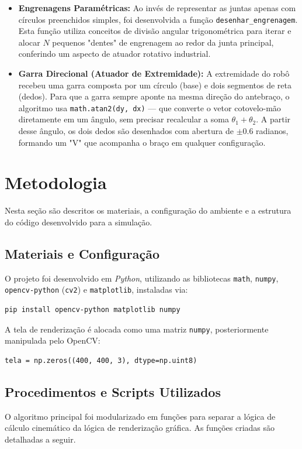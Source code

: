 \documentclass{article}
\begin{document}
\begin{itemize}
    \item \textbf{Engrenagens Paramétricas:} Ao invés de representar as juntas apenas com círculos preenchidos simples, foi desenvolvida a função \texttt{desenhar\_engrenagem}. Esta função utiliza conceitos de divisão angular trigonométrica para iterar e alocar $N$ pequenos "dentes" de engrenagem ao redor da junta principal, conferindo um aspecto de atuador rotativo industrial.
    \item \textbf{Garra Direcional (Atuador de Extremidade):} A extremidade do robô recebeu uma garra composta por um círculo (base) e dois segmentos de reta (dedos). Para que a garra sempre aponte na mesma direção do antebraço, o algoritmo usa \texttt{math.atan2(dy, dx)} — que converte o vetor cotovelo-mão diretamente em um ângulo, sem precisar recalcular a soma $\theta_1 + \theta_2$. A partir desse ângulo, os dois dedos são desenhados com abertura de $\pm 0.6$ radianos, formando um "V" que acompanha o braço em qualquer configuração.
\end{itemize}

\section{Metodologia}
Nesta seção são descritos os materiais, a configuração do ambiente e a estrutura do código desenvolvido para a simulação.

\subsection{Materiais e Configuração}
O projeto foi desenvolvido em \textit{Python}, utilizando as bibliotecas \texttt{math}, \texttt{numpy}, \texttt{opencv-python} (\texttt{cv2}) e \texttt{matplotlib}, instaladas via:

\begin{lstlisting}[style=pythonstyle]
pip install opencv-python matplotlib numpy
\end{lstlisting}

A tela de renderização é alocada como uma matriz \texttt{numpy}, posteriormente manipulada pelo OpenCV:

\begin{lstlisting}[style=pythonstyle]
tela = np.zeros((400, 400, 3), dtype=np.uint8)
\end{lstlisting}

\subsection{Procedimentos e Scripts Utilizados}
O algoritmo principal foi modularizado em funções para separar a lógica de cálculo cinemático da lógica de renderização gráfica. As funções criadas são detalhadas a seguir.
\end{document}
